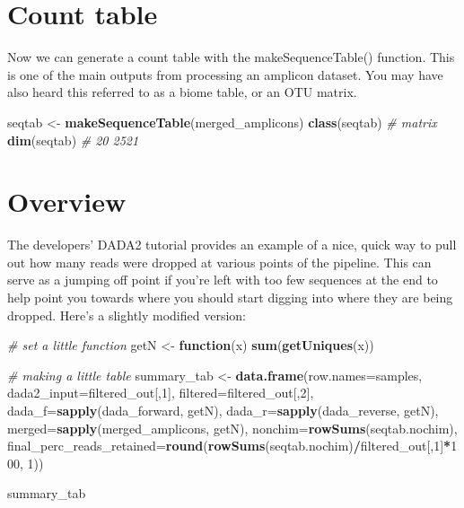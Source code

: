 \documentclass[
]{book}
\newenvironment{Shaded}{\begin{snugshade}}{\end{snugshade}}
\newcommand{\AttributeTok}[1]{\textcolor[rgb]{0.13,0.29,0.53}{#1}}
\newcommand{\CommentTok}[1]{\textcolor[rgb]{0.56,0.35,0.01}{\textit{#1}}}
\newcommand{\ControlFlowTok}[1]{\textcolor[rgb]{0.13,0.29,0.53}{\textbf{#1}}}
\newcommand{\DecValTok}[1]{\textcolor[rgb]{0.00,0.00,0.81}{#1}}
\newcommand{\FunctionTok}[1]{\textcolor[rgb]{0.13,0.29,0.53}{\textbf{#1}}}
\newcommand{\NormalTok}[1]{#1}
\newcommand{\OtherTok}[1]{\textcolor[rgb]{0.56,0.35,0.01}{#1}}
\newcommand{\SpecialCharTok}[1]{\textcolor[rgb]{0.81,0.36,0.00}{\textbf{#1}}}
\begin{document}
\hypertarget{count-table}{%
\section{Count table}\label{count-table}}

Now we can generate a count table with the makeSequenceTable() function. This is one of the main outputs from processing an amplicon dataset. You may have also heard this referred to as a biome table, or an OTU matrix.

\begin{Shaded}
\begin{Highlighting}[]
\NormalTok{seqtab }\OtherTok{\textless{}{-}} \FunctionTok{makeSequenceTable}\NormalTok{(merged\_amplicons)}
\FunctionTok{class}\NormalTok{(seqtab) }\CommentTok{\# matrix}
\FunctionTok{dim}\NormalTok{(seqtab) }\CommentTok{\# 20 2521}
\end{Highlighting}
\end{Shaded}

\hypertarget{overview}{%
\section{Overview}\label{overview}}

The developers' DADA2 tutorial provides an example of a nice, quick way to pull out how many reads were dropped at various points of the pipeline. This can serve as a jumping off point if you're left with too few sequences at the end to help point you towards where you should start digging into where they are being dropped. Here's a slightly modified version:

\begin{Shaded}
\begin{Highlighting}[]
  \CommentTok{\# set a little function}
\NormalTok{getN }\OtherTok{\textless{}{-}} \ControlFlowTok{function}\NormalTok{(x) }\FunctionTok{sum}\NormalTok{(}\FunctionTok{getUniques}\NormalTok{(x))}

  \CommentTok{\# making a little table}
\NormalTok{summary\_tab }\OtherTok{\textless{}{-}} \FunctionTok{data.frame}\NormalTok{(}\AttributeTok{row.names=}\NormalTok{samples, }\AttributeTok{dada2\_input=}\NormalTok{filtered\_out[,}\DecValTok{1}\NormalTok{],}
               \AttributeTok{filtered=}\NormalTok{filtered\_out[,}\DecValTok{2}\NormalTok{], }\AttributeTok{dada\_f=}\FunctionTok{sapply}\NormalTok{(dada\_forward, getN),}
               \AttributeTok{dada\_r=}\FunctionTok{sapply}\NormalTok{(dada\_reverse, getN), }\AttributeTok{merged=}\FunctionTok{sapply}\NormalTok{(merged\_amplicons, getN),}
               \AttributeTok{nonchim=}\FunctionTok{rowSums}\NormalTok{(seqtab.nochim),}
               \AttributeTok{final\_perc\_reads\_retained=}\FunctionTok{round}\NormalTok{(}\FunctionTok{rowSums}\NormalTok{(seqtab.nochim)}\SpecialCharTok{/}\NormalTok{filtered\_out[,}\DecValTok{1}\NormalTok{]}\SpecialCharTok{*}\DecValTok{100}\NormalTok{, }\DecValTok{1}\NormalTok{))}

\NormalTok{summary\_tab}
\end{Highlighting}
\end{Shaded}
\end{document}

